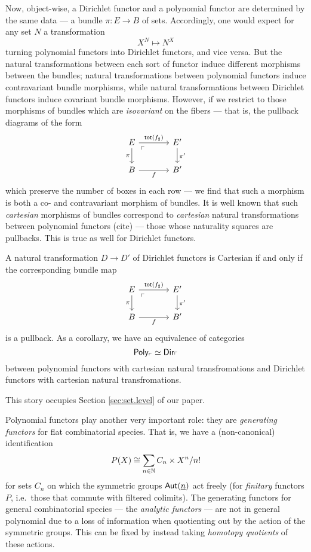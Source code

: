 Now, object-wise, a Dirichlet functor and a polynomial functor are determined by
the same data --- a bundle $\pi : E \to B$ of sets. Accordingly, one would
expect for any set $N$ a transformation
$$X^N \mapsto N^X$$
turning polynomial functors into Dirichlet functors, and vice versa. But the
natural transformations between each sort of functor induce different morphisms
between the bundles; natural transformations between polynomial functors induce
contravariant bundle morphisms, while natural transformations between Dirichlet
functors induce covariant bundle morphisms. However, if we restrict to those
morphisms of bundles which are \emph{isovariant} on the fibers --- that is, the
pullback diagrams of the form
\[
  \begin{tikzcd}[column sep=large]
E \arrow[r, "\term{tot}(f_{\sharp})"] \arrow[d, "\pi"'] \arrow[dr, phantom,
"\ulcorner" very near start] & E' \arrow[d, "\pi'"] \\
B \arrow[r, "f"']                                       & B'                  
\end{tikzcd}
\]
which preserve the number of boxes in each row --- we find that such a morphism
is both a co- and contravariant morphism of bundles. It is well known that such
\emph{cartesian} morphisms of bundles correspond to \emph{cartesian} natural
transformations between polynomial functors (cite) --- those whose naturality
squares are pullbacks. This is true as well for Dirichlet functors.
\begin{thm}
A natural transformation $D \to D'$ of Dirichlet functors is Cartesian if and
only if the corresponding bundle map
\[
  \begin{tikzcd}[column sep=large]
E \arrow[r, "\term{tot}(f_{\sharp})"] \arrow[d, "\pi"'] \arrow[dr, phantom,
"\ulcorner" very near start] & E' \arrow[d, "\pi'"] \\
B \arrow[r, "f"']                                       & B'                  
\end{tikzcd}
\]
is a pullback. As a corollary, we have an equivalence of categories
$$\mathsf{{Poly}}_{\ulcorner} \simeq \operatorname{\mathsf{{Dir}}}_{\ulcorner}$$
between polynomial functors with cartesian natural transfromations and Dirichlet
functors with cartesian natural transfromations.
\end{thm}

This story occupies Section \ref{sec:set.level} of our paper.

Polynomial functors play another very important role: they are \emph{generating
  functors} for flat combinatorial species. That is, we have a (non-canonical)
identification
$$P(X) \cong \sum_{n \in \operatorname{\mathbb{N}}} C_n \times X^n/n!$$
for sets $C_n$ on which the symmetric groups $\operatorname{\mathsf{Aut}}(\underline{n})$ act freely
(for \emph{finitary} functors $P$, i.e.\ those that commute with filtered colimits).
The generating functors for general combinatorial species --- the \emph{analytic
functors} --- are not in general polynomial due to a loss of information when
quotienting out by the action of the symmetric groups. This can be fixed by
instead taking \emph{homotopy quotients} of these actions.

